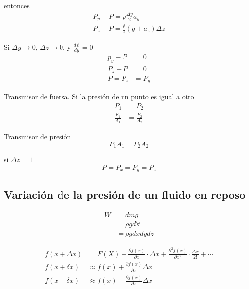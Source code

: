entonces 
\[
    \begin{split}
        P_{y} - P = \rho \frac{ \Delta y }{ 2 } a_{y} \\
        P_{z} - P = \frac{ \rho }{ 2 } (g + a_{z}) \Delta z
    \end{split}
\]

Si \( \Delta y \to 0 \), \( \Delta z \to 0 \), y \( \frac{ d \Vec{v} }{ dy } = 0 \)
\[
    \begin{split}
        p_{y} - P & = 0 \\
        P_{z} - P & = 0 \\
        P = P_{z} & = P_{y}
    \end{split}
\]

Transmisor de fuerza. Si la presión de un punto es igual a otro
\[
    \begin{split}
        P_{1} & = P_{2} \\
        \frac{ F_{1} }{ A_{1} } & = \frac{ F_{2} }{ A_{2} }
    \end{split}
\]


Transmisor de presión
\[
    P_{1} A_{1} = P_{2} A_{2}
\]


si \( \Delta z = 1 \)
\[
    P = P_{x} = P_{y} = P_{z}
\]

\subsection{Variación de la presión de un fluido en reposo}


\[
    \begin{split}
        W & = dm g \\
        & = \rho g d \forall \\
        & = \rho g dx dy dz
    \end{split}
\]

\[
    \begin{split}
        f(x + \Delta x) & = F(X) + \frac{ \partial f(x) }{ \partial x } \cdot \Delta x + \frac{ \partial^{2} f(x) }{ \partial x^{2} } \cdot \frac{ \Delta x }{ 2! } + \cdots \\
        f(x + \delta x) & \approx f(x) + \frac{ \partial f(x) }{ \partial x } \Delta x \\
        f(x - \delta x) & \approx f(x) - \frac{ \partial f(x) }{ \partial x } \Delta x \\
    \end{split}
\]

